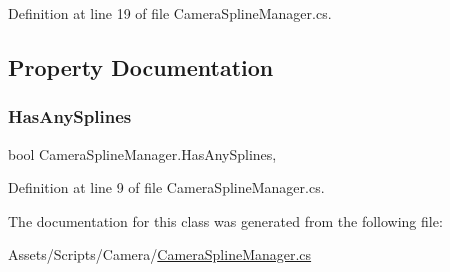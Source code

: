 Definition at line 19 of file Camera\+Spline\+Manager.\+cs.



\subsection{Property Documentation}
\mbox{\label{class_camera_spline_manager_aeb738532fbf6fc56516f66826298d981}} 
\subsubsection{\texorpdfstring{Has\+Any\+Splines}{HasAnySplines}}
{\footnotesize\ttfamily bool Camera\+Spline\+Manager.\+Has\+Any\+Splines\hspace{0.3cm}{\ttfamily [static]}, {\ttfamily [get]}}



Definition at line 9 of file Camera\+Spline\+Manager.\+cs.



The documentation for this class was generated from the following file\+:\begin{DoxyCompactItemize}
\item 
Assets/\+Scripts/\+Camera/\mbox{\hyperlink{_camera_spline_manager_8cs}{Camera\+Spline\+Manager.\+cs}}\end{DoxyCompactItemize}
